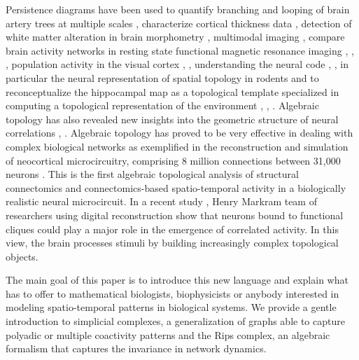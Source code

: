 \documentclass[onecollarge,runningheads]{svjour2}
\begin{document}
Persistence diagrams have been used to quantify branching and looping of brain artery trees at multiple scales \cite{bendich2016persistent},  characterize cortical thickness data \cite{chung2009persistence}, detection of white matter alteration in brain morphometry \cite{chung2015persistent}, multimodal imaging \cite{lee2017integrated}, compare brain activity networks in resting state functional magnetic resonance imaging \cite{petri2014homological}, \cite{cassidy2015brain}, \cite{lord2016insights}, population activity in the visual cortex \cite{singh2008topological}, \cite{pirino2015topological}, understanding the neural code \cite{curto2017makes}, \cite{curto2017can}, in particular  the neural representation of spatial topology in rodents \cite{chen2014neural} and to reconceptualize the hippocampal map as a topological template specialized in computing a topological representation of the environment \cite{dabaghian2012topological}, \cite{dabaghian2014reconceiving}, \cite{babichev2016topological}.
Algebraic topology has also revealed new insights into the geometric structure of neural correlations \cite{giusti2015clique},  \cite{dotko2016topological}. 
Algebraic topology has proved to be very effective in dealing with complex biological networks as exemplified in the reconstruction and simulation of neocortical microcircuitry, comprising 8 million connections between 31,000 neurons \cite{markram2015reconstruction}. This is the first algebraic topological analysis of structural connectomics and connectomics-based spatio-temporal activity in a biologically realistic neural microcircuit. In a recent study \cite{reimann2017cliques}, Henry Markram team of researchers using digital reconstruction show that neurons bound to functional cliques could play a major role in the emergence of correlated activity. In this view, the brain processes stimuli by building increasingly complex topological objects.

The main goal of this paper is to introduce this new language and explain what has to offer to mathematical biologists, biophysicists or anybody interested in modeling spatio-temporal patterns in biological systems.
We provide a gentle introduction to simplicial complexes, a generalization of graphs able to capture polyadic or multiple coactivity patterns and the Rips complex, an algebraic formalism that captures the invariance in network dynamics. 
\end{document}
